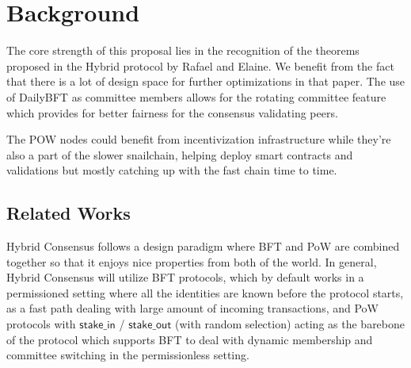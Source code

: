\section{Background}

The core strength of this proposal lies in the recognition of the theorems proposed in the Hybrid protocol\cite{pass2017hybrid}
by Rafael and Elaine. We benefit from the fact that there is a lot of design space for further optimizations in that paper.
The use of DailyBFT as committee members allows for the rotating committee feature which provides for better fairness for
the consensus validating peers.

The POW nodes could benefit from incentivization infrastructure while they're also a part of the slower snailchain, helping
deploy smart contracts and validations but mostly catching up with the fast chain time to time.

\subsection{Related Works}

Hybrid Consensus follows a design paradigm where BFT and PoW are combined together so that it enjoys nice properties
from both of the world. In general, Hybrid Consensus will utilize BFT protocols, which by default works in a permissioned
setting where all the identities are known before the protocol starts, as a fast path dealing with large amount of incoming
transactions, and PoW protocols with $\mathsf{stake\_in}$ / $\mathsf{stake\_out}$ (with random selection) acting as the barebone of the protocol which
supports BFT to deal with dynamic membership and committee switching in the permissionless setting.
